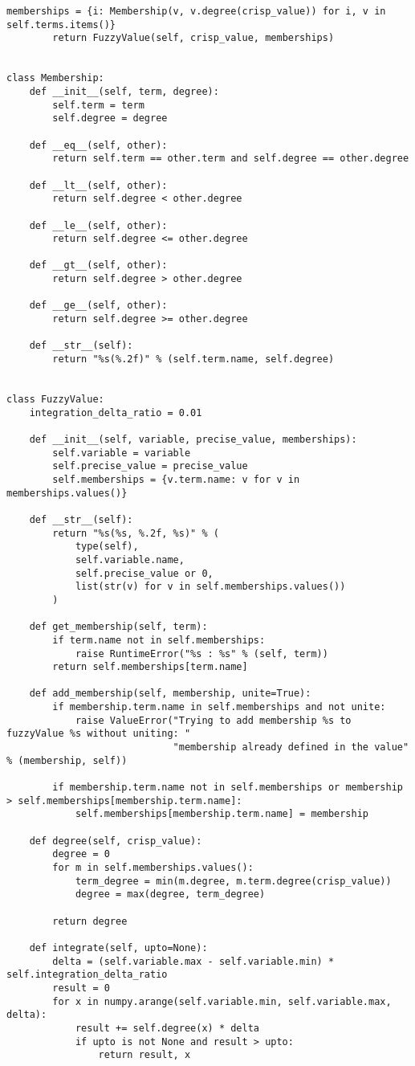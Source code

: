 \begin{lstlisting}[style=pythonstyle,caption={ }, label=lst:func:1]
		memberships = {i: Membership(v, v.degree(crisp_value)) for i, v in self.terms.items()}
		return FuzzyValue(self, crisp_value, memberships)


class Membership:
	def __init__(self, term, degree):
		self.term = term
		self.degree = degree

	def __eq__(self, other):
		return self.term == other.term and self.degree == other.degree

	def __lt__(self, other):
		return self.degree < other.degree

	def __le__(self, other):
		return self.degree <= other.degree

	def __gt__(self, other):
		return self.degree > other.degree

	def __ge__(self, other):
		return self.degree >= other.degree

	def __str__(self):
		return "%s(%.2f)" % (self.term.name, self.degree)


class FuzzyValue:
	integration_delta_ratio = 0.01

	def __init__(self, variable, precise_value, memberships):
		self.variable = variable
		self.precise_value = precise_value
		self.memberships = {v.term.name: v for v in memberships.values()}

	def __str__(self):
		return "%s(%s, %.2f, %s)" % (
			type(self),
			self.variable.name,
			self.precise_value or 0,
			list(str(v) for v in self.memberships.values())
		)

	def get_membership(self, term):
		if term.name not in self.memberships:
			raise RuntimeError("%s : %s" % (self, term))
		return self.memberships[term.name]

	def add_membership(self, membership, unite=True):
		if membership.term.name in self.memberships and not unite:
			raise ValueError("Trying to add membership %s to fuzzyValue %s without uniting: "
							 "membership already defined in the value" % (membership, self))

		if membership.term.name not in self.memberships or membership > self.memberships[membership.term.name]:
			self.memberships[membership.term.name] = membership

	def degree(self, crisp_value):
		degree = 0
		for m in self.memberships.values():
			term_degree = min(m.degree, m.term.degree(crisp_value))
			degree = max(degree, term_degree)

		return degree

	def integrate(self, upto=None):
		delta = (self.variable.max - self.variable.min) * self.integration_delta_ratio
		result = 0
		for x in numpy.arange(self.variable.min, self.variable.max, delta):
			result += self.degree(x) * delta
			if upto is not None and result > upto:
				return result, x


\end{lstlisting}
